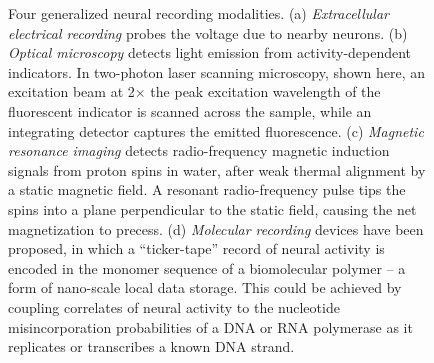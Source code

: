 \begin{figure}[htbp]
\centering
\caption{Four generalized neural recording modalities. (a) \emph{Extracellular electrical recording} probes the voltage due to nearby neurons. (b) \emph{Optical microscopy} detects light emission from activity-dependent indicators. In two-photon laser scanning microscopy, shown here, an excitation beam at 2$\times$ the peak excitation wavelength of the fluorescent indicator is scanned across the sample, while an integrating detector captures the emitted fluorescence. (c) \emph{Magnetic resonance imaging} detects radio-frequency magnetic induction signals from proton spins in water, after weak thermal alignment by a static magnetic field. A resonant radio-frequency pulse tips the spins into a plane perpendicular to the static field, causing the net magnetization to precess. (d) \emph{Molecular recording} devices have been proposed, in which a “ticker-tape” record of neural activity is encoded in the monomer sequence of a biomolecular polymer – a form of nano-scale local data storage. This could be achieved by coupling correlates of neural activity to the nucleotide misincorporation probabilities of a DNA or RNA polymerase as it replicates or transcribes a known DNA strand.}  \label{fig:modalities}
\hspace{0.1in}

\end{figure}

